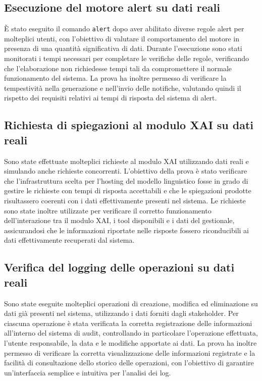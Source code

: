 \subsection{Esecuzione del motore alert su dati reali}
È stato eseguito il comando \texttt{alert} dopo aver abilitato diverse regole alert per molteplici utenti, con l'obiettivo di valutare il comportamento del motore in presenza 
di una quantità significativa di dati. Durante l'esecuzione sono stati monitorati i tempi necessari per completare le verifiche delle regole, verificando che l'elaborazione non 
richiedesse tempi tali da compromettere il normale funzionamento del sistema.
\newline
La prova ha inoltre permesso di verificare la tempestività nella generazione e nell'invio delle notifiche, valutando quindi il rispetto dei requisiti relativi ai tempi di 
risposta del sistema di alert.

\subsection{Richiesta di spiegazioni al modulo XAI su dati reali}
Sono state effettuate molteplici richieste al modulo XAI utilizzando dati reali e simulando anche richieste concorrenti. L'obiettivo della prova è stato verificare che 
l'infrastruttura scelta per l'hosting del modello linguistico fosse in grado di gestire le richieste con tempi di risposta accettabili e che le spiegazioni prodotte risultassero 
coerenti con i dati effettivamente presenti nel sistema.
\newline
Le richieste sono state inoltre utilizzate per verificare il corretto funzionamento dell'interazione tra il modulo XAI, i tool disponibili e i dati del gestionale, assicurandosi 
che le informazioni riportate nelle risposte fossero riconducibili ai dati effettivamente recuperati dal sistema.

\subsection{Verifica del logging delle operazioni su dati reali}
Sono state eseguite molteplici operazioni di creazione, modifica ed eliminazione su dati già presenti nel sistema, utilizzando i dati forniti dagli stakeholder. Per 
ciascuna operazione è stata verificata la corretta registrazione delle informazioni all'interno del sistema di audit, controllando in particolare l'operazione effettuata, 
l'utente responsabile, la data e le modifiche apportate ai dati.
\newline
La prova ha inoltre permesso di verificare la corretta visualizzazione delle informazioni registrate e la facilità di consultazione dello storico delle operazioni, con 
l'obiettivo di garantire un'interfaccia semplice e intuitiva per l'analisi dei log.

